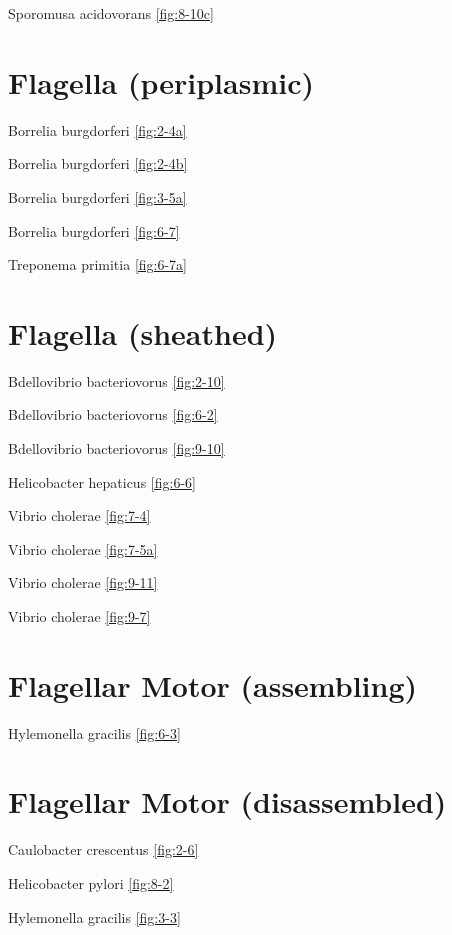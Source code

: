 \documentclass[]{tufte-book}
\begin{document}
Sporomusa acidovorans \ref{fig:8-10c}

\section{\texorpdfstring{\textbf{Flagella
(periplasmic)}}{Flagella (periplasmic)}}\label{flagella-periplasmic}

Borrelia burgdorferi \ref{fig:2-4a}

Borrelia burgdorferi \ref{fig:2-4b}

Borrelia burgdorferi \ref{fig:3-5a}

Borrelia burgdorferi \ref{fig:6-7}

Treponema primitia \ref{fig:6-7a}

\section{\texorpdfstring{\textbf{Flagella
(sheathed)}}{Flagella (sheathed)}}\label{flagella-sheathed}

Bdellovibrio bacteriovorus \ref{fig:2-10}

Bdellovibrio bacteriovorus \ref{fig:6-2}

Bdellovibrio bacteriovorus \ref{fig:9-10}

Helicobacter hepaticus \ref{fig:6-6}

Vibrio cholerae \ref{fig:7-4}

Vibrio cholerae \ref{fig:7-5a}

Vibrio cholerae \ref{fig:9-11}

Vibrio cholerae \ref{fig:9-7}

\section{\texorpdfstring{\textbf{Flagellar Motor
(assembling)}}{Flagellar Motor (assembling)}}\label{flagellar-motor-assembling}

Hylemonella gracilis \ref{fig:6-3}

\section{\texorpdfstring{\textbf{Flagellar Motor
(disassembled)}}{Flagellar Motor (disassembled)}}\label{flagellar-motor-disassembled}

Caulobacter crescentus \ref{fig:2-6}

Helicobacter pylori \ref{fig:8-2}

Hylemonella gracilis \ref{fig:3-3}
\end{document}
